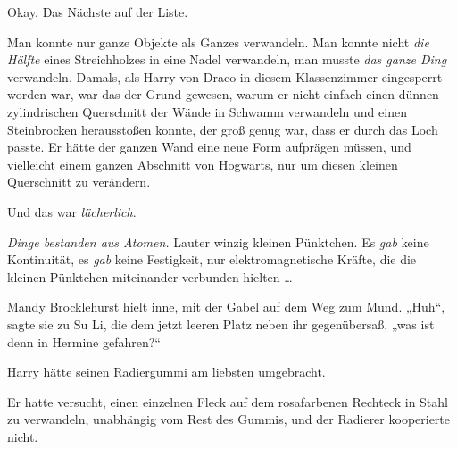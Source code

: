 Okay. Das Nächste auf der Liste.

Man konnte nur ganze Objekte als Ganzes verwandeln. Man konnte nicht \emph{die Hälfte} eines Streichholzes in eine Nadel verwandeln, man musste \emph{das ganze Ding} verwandeln. Damals, als Harry von Draco in diesem Klassenzimmer eingesperrt worden war, war das der Grund gewesen, warum er nicht einfach einen dünnen zylindrischen Querschnitt der Wände in Schwamm verwandeln und einen Steinbrocken herausstoßen konnte, der groß genug war, dass er durch das Loch passte. Er hätte der ganzen Wand eine neue Form aufprägen müssen, und vielleicht einem ganzen Abschnitt von Hogwarts, nur um diesen kleinen Querschnitt zu verändern.

Und das war \emph{lächerlich}.

\emph{Dinge bestanden aus Atomen.} Lauter winzig kleinen Pünktchen. Es \emph{gab} keine Kontinuität, es \emph{gab} keine Festigkeit, nur elektromagnetische Kräfte, die die kleinen Pünktchen miteinander verbunden hielten …

\later

Mandy Brocklehurst hielt inne, mit der Gabel auf dem Weg zum Mund.
„Huh“, sagte sie zu Su Li, die dem jetzt leeren Platz neben ihr gegenübersaß, „was ist denn in Hermine gefahren?“

\later

Harry hätte seinen Radiergummi am liebsten umgebracht.

Er hatte versucht, einen einzelnen Fleck auf dem rosafarbenen Rechteck in Stahl zu verwandeln, unabhängig vom Rest des Gummis, und der Radierer kooperierte nicht.

